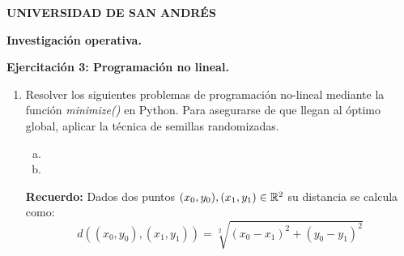 \documentclass[12pt]{article}
\begin{document}
    \begin{center}
        {\bf UNIVERSIDAD DE SAN ANDR\'ES}
        \medskip
        
        {\bf Investigación operativa.}
        \medskip
        
        {\bf Ejercitaci\'on 3: Programación no lineal.}
        \medskip


        \begin{enumerate}
            \item Resolver los siguientes problemas de programación no-lineal mediante la función
            \emph{minimize()} en Python. 
            Para asegurarse de que llegan al óptimo global, aplicar la técnica
            de semillas randomizadas.
            \begin{enumerate}[a)]
                \item 
                
                \item 
            \end{enumerate}
            \medskip 
            \medskip 
            \textbf{Recuerdo:}
            Dados dos puntos $(x_{0},y_{0}), (x_{1},y_{1}) \in \mathbb{R}^{2}$ su distancia se calcula como:
            \[
                d((x_{0},y_{0}), (x_{1},y_{1})) = \sqrt[2]{(x_{0} - x_{1})^{2} + (y_{0} - y_{1})^{2}}
            \]



\end{enumerate}
\end{center}
\end{document}
